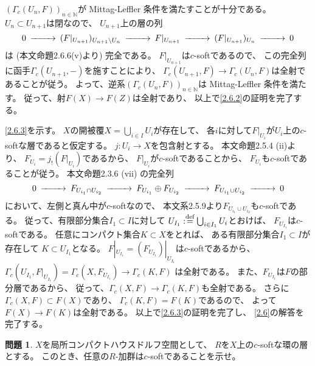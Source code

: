 \documentclass[uplatex,dvipdfmx]{jsarticle}
\makeatletter
\theoremstyle{definition}
\newtheorem{prob}[prob]{問題}
\renewenvironment{proof}[1][\proofname]{
  \pushQED{\qed}%
  \normalfont \topsep6\p@\@plus6\p@\relax
  \trivlist
  \item[\hskip\labelsep
    #1\@addpunct{\textbf{.}}]\ignorespaces
}{%
  \popQED\endtrivlist\@endpefalse
}
\providecommand{\proofname}{証明}
\newcommand\N{\mathbb{N}}
\def\dfn{:\overset{\mbox{{\scriptsize def}}}{=}}
\makeatother
\begin{document}
\begin{proof}
  \((\Gamma_c(U_n,F))_{n\in \N}\)が Mittag-Leffler 条件を満たすことが十分である。
  \(U_n\subset U_{n+1}\)は閉なので、
  \(U_{n+1}\)上の層の列
  \[
  \begin{CD}
    0 @>>> (F|_{U_{n+1}})_{U_{n+1}\setminus U_n}
    @>>> F|_{U_{n+1}} @>>> (F|_{U_{n+1}})_{U_n} @>>> 0
  \end{CD}
  \]
  は (本文命題2.6.6(v)より) 完全である。
  \(F|_{U_{n+1}}\)は\(c\)-softであるので、
  この完全列に函手\(\Gamma_c(U_{n+1},-)\)を施すことにより、
  \(\Gamma_c(U_{n+1},F)\to \Gamma_c(U_n,F)\)は全射であることが従う。
  よって、逆系\((\Gamma_c(U_n,F))_{n\in \N}\)は Mittag-Leffler 条件を満たす。
  従って、射\(F(X)\to F(Z)\)は全射であり、
  以上で\ref{2.6.2}の証明を完了する。

  \ref{2.6.3}を示す。
  \(X\)の開被覆\(X = \bigcup_{i\in I}U_i\)が存在して、
  各\(i\)に対して\(F|_{U_i}\)が\(U_i\)上の\(c\)-softな層であると仮定する。
  \(j:U_i\to X\)を包含射とする。
  本文命題2.5.4 (ii)より、
  \(F_{U_i} = j_!(F|_{U_i})\)であるから、
  \(F|_{U_i}\)が\(c\)-softであることから、
  \(F_{U_i}\)も\(c\)-softであることが従う。
  本文命題2.3.6 (vii) の完全列
  \[
  \begin{CD}
    0 @>>> F_{U_{i_1}\cap U_{i_2}} @>>> F_{U_{i_1}} \oplus F_{U_{i_2}}
    @>>> F_{U_{i_1}\cup U_{i_2}} @>>> 0
  \end{CD}
  \]
  において、左側と真ん中が\(c\)-softなので、
  本文系2.5.9より\(F_{U_{i_1}\cup U_{i_2}}\)も\(c\)-softである。
  従って、有限部分集合\(I_1\subset I\)に対して
  \(U_{I_1} \dfn \bigcup_{i\in I_1} U_i\)とおけば、
  \(F_{U_{I_1}}\)は\(c\)-softである。
  任意にコンパクト集合\(K\subset X\)をとれば、
  ある有限部分集合\(I_1\subset I\)が存在して
  \(K\subset U_{I_1}\)となる。
  \(F|_{U_{I_1}} = (F_{U_{I_1}})|_{U_{I_1}}\)は\(c\)-softであるから、
  \(\Gamma_c(U_{I_1},F|_{U_{I_1}}) = \Gamma_c(X,F_{U_{I_1}}) \to \Gamma_c(K,F)\)
  は全射である。
  また、\(F_{U_{I_1}}\)は\(F\)の部分層であるから、
  従って、\(\Gamma_c(X,F) \to \Gamma_c(K,F)\)も全射である。
  さらに\(\Gamma_c(X,F) \subset F(X)\)であり、
  \(\Gamma_c(K,F) = F(K)\)であるので、
  よって\(F(X) \to F(K)\)は全射である。
  以上で\ref{2.6.3}の証明を完了し、
  \autoref{2.6}の解答を完了する。
\end{proof}






\begin{prob}\label{2.7}
  \(X\)を局所コンパクトハウスドルフ空間として、
  \(R\)を\(X\)上の\(c\)-softな環の層とする。
  このとき、任意の\(R\)-加群は\(c\)-softであることを示せ。
\end{prob}
\end{document}
